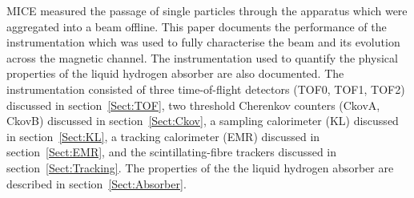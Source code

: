 MICE measured the passage of single particles through the apparatus which were aggregated into
a beam offline.
This paper documents the performance of the instrumentation which was
used to fully characterise the beam and its evolution across the magnetic
channel.
The instrumentation used to quantify the physical properties of the liquid hydrogen absorber are also documented.
The instrumentation consisted of three time-of-flight detectors
(TOF0, TOF1, TOF2) discussed in section~\ref{Sect:TOF}, two 
threshold Cherenkov counters (CkovA, CkovB) discussed in
section~\ref{Sect:Ckov}, a sampling calorimeter (KL) discussed in
section~\ref{Sect:KL}, a tracking calorimeter (EMR) discussed in
section~\ref{Sect:EMR}, and the scintillating-fibre trackers discussed in section~\ref{Sect:Tracking}.
The properties of the the liquid hydrogen
absorber are described in section~\ref{Sect:Absorber}.
